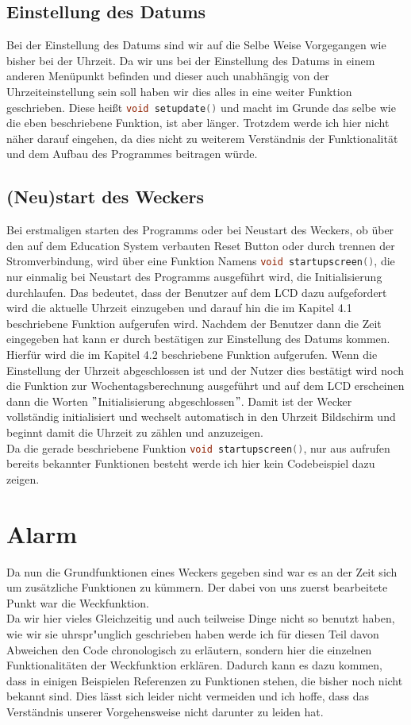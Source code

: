\documentclass[openright,twoside,11pt,a4paper]{scrartcl}
\begin{document}
\begin{flushleft}
	 	\subsection{Einstellung des Datums}
	 	Bei der Einstellung des Datums sind wir auf die Selbe Weise Vorgegangen wie bisher bei der Uhrzeit. Da wir uns bei der Einstellung des Datums in einem anderen Menüpunkt befinden und dieser auch unabhängig von der Uhrzeiteinstellung sein soll haben wir dies alles in eine weiter Funktion geschrieben. Diese heißt \lstinline[language=c++,]|void setupdate()| und macht im Grunde das selbe wie die eben beschriebene Funktion, ist aber länger. Trotzdem werde ich hier nicht näher darauf eingehen, da dies nicht zu weiterem Verständnis der Funktionalität und dem Aufbau des Programmes beitragen würde.
	 	\subsection{(Neu)start des Weckers}
	 	Bei erstmaligen starten des Programms oder bei Neustart des Weckers, ob über den auf dem Education System verbauten Reset Button oder durch trennen der Stromverbindung, wird über eine Funktion Namens \lstinline[language=c++]|void startupscreen()|, die nur einmalig bei Neustart des Programms ausgeführt wird, die Initialisierung durchlaufen. Das bedeutet, dass der Benutzer auf dem LCD dazu aufgefordert wird die aktuelle Uhrzeit einzugeben und darauf hin die im Kapitel 4.1 beschriebene Funktion aufgerufen wird. Nachdem der Benutzer dann die Zeit eingegeben hat kann er durch bestätigen zur Einstellung des Datums kommen. Hierfür wird die im Kapitel 4.2 beschriebene Funktion aufgerufen. Wenn die Einstellung der Uhrzeit abgeschlossen ist und der Nutzer dies bestätigt wird noch die Funktion zur Wochentagsberechnung ausgeführt und auf dem LCD erscheinen dann die Worten $"$Initialisierung abgeschlossen$"$. Damit ist der Wecker vollständig initialisiert und wechselt automatisch in den Uhrzeit Bildschirm und beginnt damit die Uhrzeit zu zählen und anzuzeigen. \\
	 	Da die gerade beschriebene Funktion \lstinline[language=c++]|void startupscreen()|, nur aus aufrufen bereits bekannter Funktionen besteht werde ich hier kein Codebeispiel dazu zeigen. \\
	 	\section{Alarm}
	 	Da nun die Grundfunktionen eines Weckers gegeben sind war es an der Zeit sich um zusätzliche Funktionen zu kümmern. Der dabei von uns zuerst bearbeitete Punkt war die Weckfunktion. \\
	 	Da wir hier vieles Gleichzeitig und auch teilweise Dinge nicht so benutzt haben, wie wir sie uhrspr"unglich geschrieben haben werde ich für diesen Teil davon Abweichen den Code chronologisch zu erläutern, sondern hier die einzelnen Funktionalitäten der Weckfunktion erklären. Dadurch kann es dazu kommen, dass in einigen Beispielen Referenzen zu Funktionen stehen, die bisher noch nicht bekannt sind. Dies lässt sich leider nicht vermeiden und ich hoffe, dass das Verständnis unserer Vorgehensweise nicht darunter zu leiden hat.

\end{flushleft}
\end{document}
